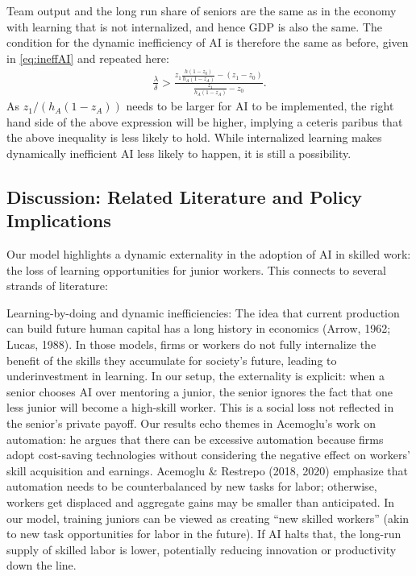 \documentclass[12pt]{article}
\begin{document}
{Team output and the long run share of seniors are the same as in the economy with learning that is not internalized, and hence GDP is also the same. The condition for the dynamic inefficiency of AI is therefore the same as before, given in \eqref{eq:ineffAI} and repeated here:
\begin{align*}
\frac{\lambda}{\delta}>\frac{z_1\frac{h(1-z_0)}{h_A(1-z_A)}-(z_1-z_0)}{\frac{z_1}{h_A(1-z_A)}-z_0}.
\end{align*}
As $z_1/(h_A(1-z_A))$ needs to be larger for AI to be implemented, the right hand side of the above expression will be higher, implying a ceteris paribus that the above inequality is less likely to hold. While internalized learning makes dynamically inefficient AI less likely to happen, it is still a possibility. 


\subsection{Discussion: Related Literature and Policy
Implications}\label{discussion-related-literature-and-policy-implications}

Our model highlights a {dynamic externality} in the adoption of
AI in skilled work: the loss of learning opportunities for junior
workers. This connects to several strands of literature:

{Learning-by-doing and dynamic inefficiencies:} The idea that
current production can build future human capital has a long history
in economics (Arrow, 1962; Lucas, 1988). In those models, firms or
workers do not fully internalize the benefit of the skills they
accumulate for society's future, leading to underinvestment in
learning. In our setup, the externality is explicit: when a senior
chooses AI over mentoring a junior, the senior ignores the fact that
one less junior will become a high-skill worker. This is a social loss
not reflected in the senior's private payoff. Our results echo themes
in Acemoglu's work on automation: he argues that there can be
{excessive automation} because firms adopt cost-saving
technologies without considering the negative effect on workers' skill
acquisition and earnings. Acemoglu \& Restrepo (2018, 2020) emphasize
that automation needs to be counterbalanced by new tasks for labor;
otherwise, workers get displaced and aggregate gains may be smaller
than anticipated. In our model, training juniors can be viewed as
creating ``new skilled workers'' (akin to new task opportunities for
labor in the future). If AI halts that, the long-run supply of skilled
labor is lower, potentially reducing innovation or productivity down
the line.

}
\end{document}
